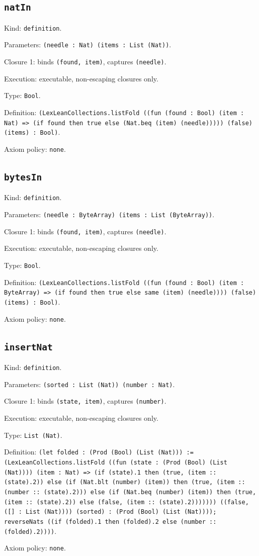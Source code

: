 \documentclass[11pt]{article}
\begin{document}
\subsection*{\texttt{natIn}}
\noindent Kind: \texttt{definition}.\par
\noindent Parameters: \texttt{(needle : Nat) (items : List (Nat))}.\par
\noindent Closure 1: binds \texttt{(found, item)}, captures \texttt{(needle)}.\par
\noindent Execution: executable, non-escaping closures only.\par
\noindent Type: \texttt{Bool}.\par
\noindent Definition: \texttt{(LexLeanCollections.listFold ((fun (found : Bool) (item : Nat) => (if found then true else (Nat.beq (item) (needle))))) (false) (items) : Bool)}.\par
\noindent Axiom policy: \texttt{none}.\par
\subsection*{\texttt{bytesIn}}
\noindent Kind: \texttt{definition}.\par
\noindent Parameters: \texttt{(needle : ByteArray) (items : List (ByteArray))}.\par
\noindent Closure 1: binds \texttt{(found, item)}, captures \texttt{(needle)}.\par
\noindent Execution: executable, non-escaping closures only.\par
\noindent Type: \texttt{Bool}.\par
\noindent Definition: \texttt{(LexLeanCollections.listFold ((fun (found : Bool) (item : ByteArray) => (if found then true else same (item) (needle)))) (false) (items) : Bool)}.\par
\noindent Axiom policy: \texttt{none}.\par
\subsection*{\texttt{insertNat}}
\noindent Kind: \texttt{definition}.\par
\noindent Parameters: \texttt{(sorted : List (Nat)) (number : Nat)}.\par
\noindent Closure 1: binds \texttt{(state, item)}, captures \texttt{(number)}.\par
\noindent Execution: executable, non-escaping closures only.\par
\noindent Type: \texttt{List (Nat)}.\par
\noindent Definition: \texttt{(let folded : (Prod (Bool) (List (Nat))) := (LexLeanCollections.listFold ((fun (state : (Prod (Bool) (List (Nat)))) (item : Nat) => (if (state).1 then (true, (item :: (state).2)) else (if (Nat.blt (number) (item)) then (true, (item :: (number :: (state).2))) else (if (Nat.beq (number) (item)) then (true, (item :: (state).2)) else (false, (item :: (state).2))))))) ((false, ([] : List (Nat)))) (sorted) : (Prod (Bool) (List (Nat)))); reverseNats ((if (folded).1 then (folded).2 else (number :: (folded).2))))}.\par
\noindent Axiom policy: \texttt{none}.\par
\end{document}
